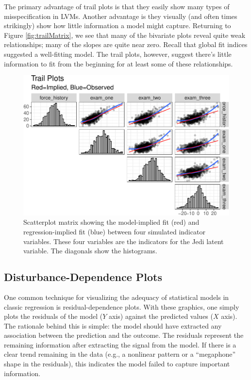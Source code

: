 \documentclass[
  english,
  man]{apa6}
\begin{document}
The primary advantage of trail plots is that they easily show many types of misspecification in LVMs. Another advantage is they visually (and often times strikingly) show how little information a model might capture. Returning to Figure \ref{fig:trailMatrix}, we see that many of the bivariate plots reveal quite weak relationships; many of the slopes are quite near zero. Recall that global fit indices suggested a well-fitting model. The trail plots, however, suggest there's little information to fit from the beginning for at least some of these relationships.

\begin{figure}

{\centering \includegraphics[width=0.9\linewidth]{flexplavaan_draft_files/figure-latex/trailMatrix2-1} 

}

\caption{Scatterplot matrix showing the model-implied fit (red) and regression-implied fit (blue) between four simulated indicator variables. These four variables are the indicators for the Jedi latent variable. The diagonals show the histograms.}\label{fig:trailMatrix2}
\end{figure}

\hypertarget{disturbance-dependence-plots}{%
\subsection{Disturbance-Dependence Plots}\label{disturbance-dependence-plots}}

One common technique for visualizing the adequacy of statistical models in classic regression is residual-dependence plots. With these graphics, one simply plots the residuals of the model (\(Y\) axis) against the predicted values (\(X\) axis). The rationale behind this is simple: the model should have extracted any association between the prediction and the outcome. The residuals represent the remaining information after extracting the signal from the model. If there is a clear trend remaining in the data (e.g., a nonlinear pattern or a ``megaphone'' shape in the residuals), this indicates the model failed to capture important information.
\end{document}

